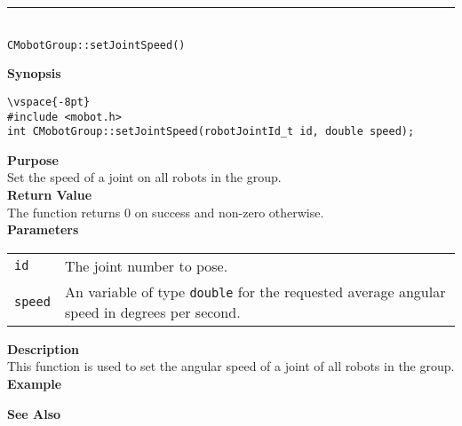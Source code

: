 \noindent
\vspace{5pt}
\rule{4.5in}{0.015in}\\
\noindent
{\LARGE \texttt{CMobotGroup::setJointSpeed()}}\\
{}

\noindent
{\bf Synopsis}
\begin{verbatim}
\vspace{-8pt}
#include <mobot.h>
int CMobotGroup::setJointSpeed(robotJointId_t id, double speed);
\end{verbatim}

\noindent
{\bf Purpose}\\
Set the speed of a joint on all robots in the group.\\

\noindent
{\bf Return Value}\\
The function returns 0 on success and non-zero otherwise.\\

\noindent
{\bf Parameters}
\vspace{-0.1in}
\begin{description}
\item               
\begin{tabular}{p{10 mm}p{145 mm}}
\texttt{id} & The joint number to pose. \\
\texttt{speed} & An variable of type \texttt{double} for the requested average
angular speed in degrees per second.
\end{tabular}
\end{description}

\noindent
{\bf Description}\\
This function is used to set the angular speed of a joint of all robots in the group. 
\noindent\\
{\bf Example}\\
\noindent

\noindent
{\bf See Also}\\

